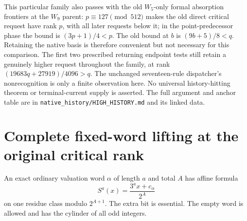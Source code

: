 \documentclass[11pt]{article}
\begin{document}
This particular family also passes with the old $W_5$-only formal
absorption frontiers at the $W_9$ parent: $p\equiv127\pmod{512}$
makes the old direct critical request have rank $p$, with all later
requests below it; in the point-predecessor phase the bound is
$(3p+1)/4<p$. The old bound at $b$ is $(9b+5)/8<q$.
Retaining the native basis is therefore convenient but not necessary
for this comparison. The first two prescribed returning endpoint tests
still retain a genuinely higher request throughout the family,
at rank $(19683q+27919)/4096>q$.
The unchanged seventeen-rule dispatcher's nonrecognition is only a
finite observation here. No universal history-hitting theorem or
terminal-current supply is asserted. The full argument and anchor table
are in \texttt{native\_history/HIGH\_HISTORY.md} and its linked data.

\section{Complete fixed-word lifting at the original critical rank}
An exact ordinary valuation word $\alpha$ of length $a$ and total
$A$ has affine formula
\[
 S^a(x)=\frac{3^a x+c_\alpha}{2^A}
\]
on one residue class modulo $2^{A+1}$. The extra bit is essential.
The empty word is allowed and has the cylinder of all odd integers.
\end{document}
